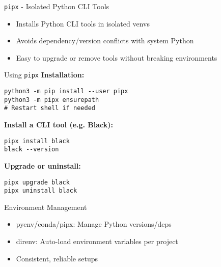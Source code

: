 \documentclass[aspectratio=169]{beamer}
\begin{document}
\begin{frame}{\texttt{pipx} - Isolated Python CLI Tools}
\begin{itemize}
\item Installs Python CLI tools in isolated venvs
\item Avoids dependency/version conflicts with system Python
\item Easy to upgrade or remove tools without breaking environments
\end{itemize}
\end{frame}

\begin{frame}[fragile]{Using \texttt{pipx}}
\textbf{Installation:}
\begin{verbatim}
python3 -m pip install --user pipx
python3 -m pipx ensurepath
# Restart shell if needed
\end{verbatim}

\textbf{Install a CLI tool (e.g. Black):}
\begin{verbatim}
pipx install black
black --version
\end{verbatim}

\textbf{Upgrade or uninstall:}
\begin{verbatim}
pipx upgrade black
pipx uninstall black
\end{verbatim}
\end{frame}

%
\begin{frame}{Environment Management}
\begin{itemize}
\item pyenv/conda/pipx: Manage Python versions/deps
\item direnv: Auto-load environment variables per project
\item Consistent, reliable setups
\end{itemize}
\end{frame}
\end{document}
